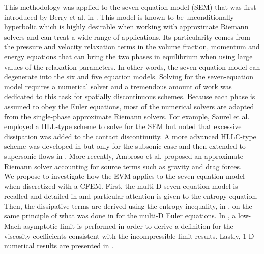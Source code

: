 This methodology was applied to the seven-equation model (SEM) that was first introduced by Berry et al. in \cite{SEM}. This model is known to be unconditionally hyperbolic which is highly desirable when working with approximate Riemann solvers and can treat a wide range of applications. Its particularity comes from the pressure and velocity relaxation terms in the volume fraction, momentum and energy equations that can bring the two phases in equilibrium when using large values of the relaxation parameters. In other words, the seven-equation model can degenerate into the six and five equation models. Solving for the seven-equation model requires a numerical solver and a tremendous amount of work was dedicated to this task for spatially discontinuous schemes. Because each phase is assumed to obey the Euler equations, most of the numerical solvers are adapted from the single-phase approximate Riemann solvers. For example, Saurel et al. \cite{Saurel_2001a, Saurel_2001b} employed a HLL-type scheme to solve for the SEM but noted that excessive dissipation was added to the contact discontinuity. A more advanced HLLC-type scheme was developed in \cite{Li_2004} but only for the subsonic case and then extended to supersonic flows in \cite{Zein_2010}. More recently, Ambroso et al. \cite{Ambroso_2012} proposed an approximate Riemann solver accounting for source terms such as gravity and drag forces.\\

We propose to investigate how the EVM applies to the seven-equation model when discretized with a CFEM. First, the multi-D seven-equation model is recalled and detailed in  and particular attention is given to the entropy equation. Then, the dissipative terms are derived using the entropy inequality, in , on the same principle of what was done in  for the multi-D Euler equations. In , a low-Mach asymptotic limit is performed in order to derive a definition for the viscosity coefficients consistent with the incompressible limit results. Lastly, 1-D numerical results are presented in .

